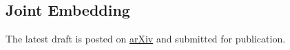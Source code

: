 \documentclass[simplex.tex]{subfiles}
\begin{document}
\subsection{Joint Embedding}
The latest draft is posted on \href{https://arxiv.org/abs/1703.03862}{arXiv} and submitted for publication. 
\end{document}
